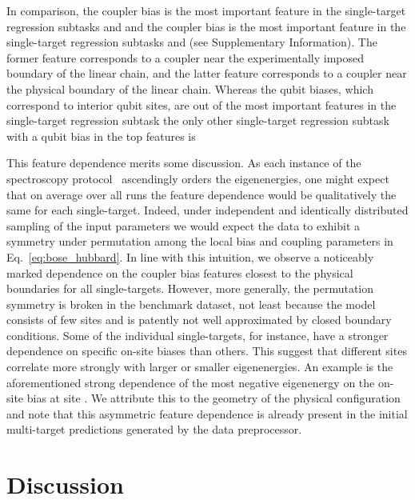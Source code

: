 \documentclass[aps,twocolumn,superscriptaddress,floatfix,preprintnumbers,showkeys]{revtex4}
\begin{document}
In comparison, the coupler  bias is the most important feature in the single-target regression subtasks  and  and the coupler  bias is the most important feature in the single-target regression subtasks  and  (see Supplementary Information). The former feature corresponds to a coupler near the experimentally imposed boundary of the linear chain, and the latter feature corresponds to a coupler near the physical boundary of the linear chain. Whereas the qubit biases, which correspond to interior qubit sites, are  out of the  most important features in the single-target regression subtask  the only other single-target regression subtask with a qubit bias in the top  features is  

This feature dependence merits some discussion. As each instance of the spectroscopy protocol~\cite{Roushan_2017} ascendingly orders the eigenenergies, one might expect that on average over all runs the feature dependence would be qualitatively the same for each single-target. Indeed, under independent and identically distributed sampling of the input parameters we would expect the data to exhibit a symmetry under permutation among the local bias and coupling parameters in Eq.~\ref{eq:bose_hubbard}. In line with this intuition, we observe a noticeably marked dependence on the coupler bias features closest to the physical boundaries for all single-targets. However, more generally, the permutation symmetry is broken in the benchmark dataset, not least because the model consists of few sites and is patently not well approximated by closed boundary conditions. Some of the individual single-targets, for instance, have a stronger dependence on specific on-site biases than others. This suggest that different sites correlate more strongly with larger or smaller eigenenergies. An example is the aforementioned strong dependence of the most negative eigenenergy  on the on-site bias at site . We attribute this to the geometry of the physical configuration and note that this asymmetric feature dependence is already present in the initial multi-target predictions generated by the data preprocessor.

\section*{Discussion}
\end{document}
